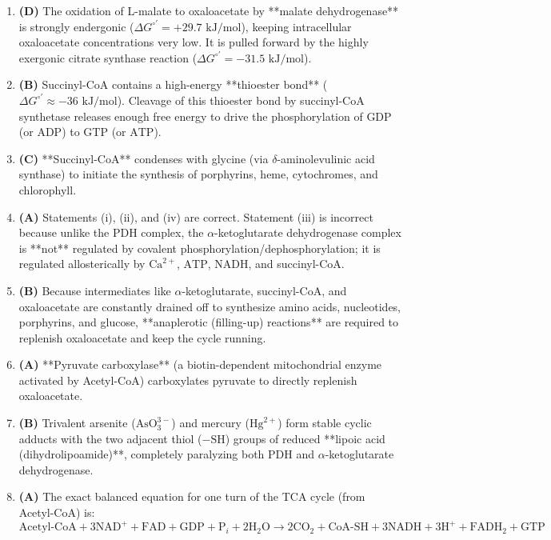 \documentclass[11pt, a4paper]{article}
\begin{document}
\begin{enumerate}[label=\textbf{\arabic*.}]
\item \textbf{(D)} The oxidation of L-malate to oxaloacetate by **malate dehydrogenase** is strongly endergonic ($\Delta G^{\circ\prime} = +29.7\text{ kJ/mol}$), keeping intracellular oxaloacetate concentrations very low. It is pulled forward by the highly exergonic citrate synthase reaction ($\Delta G^{\circ\prime} = -31.5\text{ kJ/mol}$).

\item \textbf{(B)} Succinyl-CoA contains a high-energy **thioester bond** ($\Delta G^{\circ\prime} \approx -36\text{ kJ/mol}$). Cleavage of this thioester bond by succinyl-CoA synthetase releases enough free energy to drive the phosphorylation of $\text{GDP}$ (or $\text{ADP}$) to $\text{GTP}$ (or $\text{ATP}$).

\item \textbf{(C)} **Succinyl-CoA** condenses with glycine (via $\delta$-aminolevulinic acid synthase) to initiate the synthesis of porphyrins, heme, cytochromes, and chlorophyll.

\item \textbf{(A)} Statements (i), (ii), and (iv) are correct. Statement (iii) is incorrect because unlike the PDH complex, the $\alpha$-ketoglutarate dehydrogenase complex is **not** regulated by covalent phosphorylation/dephosphorylation; it is regulated allosterically by $\text{Ca}^{2+}$, $\text{ATP}$, $\text{NADH}$, and succinyl-CoA.

\item \textbf{(B)} Because intermediates like $\alpha$-ketoglutarate, succinyl-CoA, and oxaloacetate are constantly drained off to synthesize amino acids, nucleotides, porphyrins, and glucose, **anaplerotic (filling-up) reactions** are required to replenish oxaloacetate and keep the cycle running.

\item \textbf{(A)} **Pyruvate carboxylase** (a biotin-dependent mitochondrial enzyme activated by Acetyl-CoA) carboxylates pyruvate to directly replenish oxaloacetate.

\item \textbf{(B)} Trivalent arsenite ($\text{AsO}_3^{3-}$) and mercury ($\text{Hg}^{2+}$) form stable cyclic adducts with the two adjacent thiol ($-\text{SH}$) groups of reduced **lipoic acid (dihydrolipoamide)**, completely paralyzing both PDH and $\alpha$-ketoglutarate dehydrogenase.

\item \textbf{(A)} The exact balanced equation for one turn of the TCA cycle (from Acetyl-CoA) is:
$$\text{Acetyl-CoA} + 3\text{NAD}^+ + \text{FAD} + \text{GDP} + \text{P}_i + 2\text{H}_2\text{O} \rightarrow 2\text{CO}_2 + \text{CoA-SH} + 3\text{NADH} + 3\text{H}^+ + \text{FADH}_2 + \text{GTP}$$


\end{enumerate}
\end{document}
